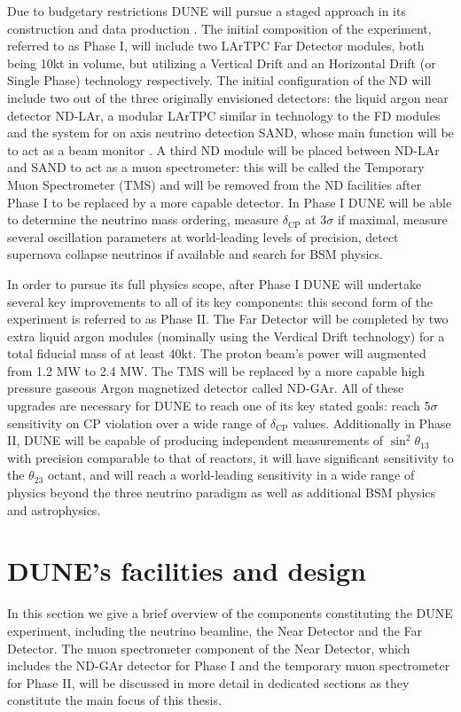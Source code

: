 Due to budgetary restrictions DUNE will pursue a staged approach in its construction and data production \cite{DUNE:2022Snowmass}. The initial composition of the experiment, referred to as Phase I, will include two LArTPC Far Detector modules, both being 10kt in volume, but utilizing a Vertical Drift \cite{DUNE:2023TDRVD} and an Horizontal Drift (or Single Phase) technology \cite{DUNE:2020TDR4} respectively. The initial configuration of the ND will include two out of the three originally envisioned detectors: the liquid argon near detector ND-LAr, a modular LArTPC similar in technology to the FD modules and the system for on axis neutrino detection SAND, whose main function will be to act as a beam monitor \cite{Battisti:2022ND}. A third ND module will be placed between ND-LAr and SAND to act as a muon spectrometer: this will be called the Temporary Muon Spectrometer (TMS) and will be removed from the ND facilities after Phase I to be replaced by a more capable detector. In Phase I DUNE will be able to determine the neutrino mass ordering, measure $\delta_\textrm{CP}$ at 3$\sigma$ if maximal, measure several oscillation parameters at world-leading levels of precision, detect supernova collapse neutrinos if available and search for BSM physics. 

In order to pursue its full physics scope, after Phase I DUNE will undertake several key improvements to all of its key components: this second form of the experiment is referred to as Phase II. The Far Detector will be completed by two extra liquid argon modules (nominally using the Verdical Drift technology) for a total fiducial mass of at least 40kt. The proton beam's power will augmented from 1.2 MW to 2.4 MW. The TMS will be replaced by a more capable high pressure gaseous Argon magnetized detector called ND-GAr. All of these upgrades are necessary for DUNE to reach one of its key stated goals: reach 5$\sigma$ sensitivity on CP violation over a wide range of $\delta_\textrm{CP}$ values. Additionally in Phase II, DUNE will be capable of producing independent measurements of $\sin^2{\theta_{13}}$ with precision comparable to that of reactors, it will have significant sensitivity to the $\theta_{23}$ octant, and will reach a world-leading sensitivity in a wide range of physics beyond the three neutrino paradigm as well as additional BSM physics and astrophysics. 

\section{DUNE's facilities and design}
In this section we give a brief overview of the components constituting the DUNE experiment, including the neutrino beamline, the Near Detector and the Far Detector. The muon spectrometer component of the Near Detector, which includes the ND-GAr detector for Phase I and the temporary muon spectrometer for Phase II, will be discussed in more detail in dedicated sections as they constitute the main focus of this thesis.


